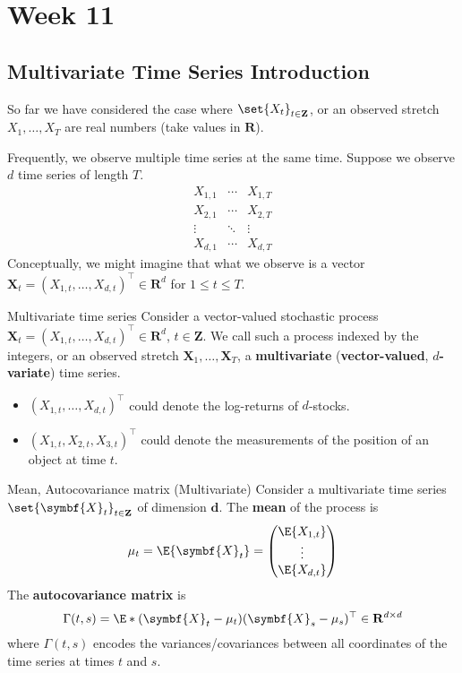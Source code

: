\chapter{Week 11}
\section{Multivariate Time Series Introduction}
So far we have considered the case where
$ \set{X_t}_{t\in\mathbf{Z}} $,
or an observed stretch $ X_1,\ldots,X_T $
are real numbers (take values in $ \mathbf{R} $).

Frequently, we observe multiple time series at the same time.
Suppose we observe $ d $ time series of length $ T $.
\[ \begin{matrix}
        X_{1,1} & \cdots & X_{1,T} \\
        X_{2,1} & \cdots & X_{2,T} \\
        \vdots  & \ddots & \vdots  \\
        X_{d,1} & \cdots & X_{d,T}
    \end{matrix} \]
Conceptually, we might imagine that what we observe
is a vector $ \symbf{X}_t=(X_{1,t},\ldots,X_{d,t})^\top\in\mathbf{R}^d $
for $ 1\le t\le T $.
\begin{Definition}{Multivariate time series}{}
    Consider a vector-valued stochastic process
    $ \symbf{X}_t=(X_{1,t},\ldots,X_{d,t})^\top\in\mathbf{R}^d $,
    $ t\in\mathbf{Z} $. We call such a process indexed
    by the integers, or an observed stretch
    $ \symbf{X}_1,\ldots,\symbf{X}_{T} $,
    a \textbf{multivariate} (\textbf{vector-valued}, \textbf{$d$-variate}) time series.
\end{Definition}
\begin{Example}{}{}
    \begin{itemize}
        \item $ (X_{1,t},\ldots,X_{d,t})^\top $ could denote the log-returns of $ d $-stocks.
        \item $ (X_{1,t},X_{2,t},X_{3,t})^\top $ could denote the measurements of the position
              of an object at time $ t $.
    \end{itemize}
\end{Example}
\begin{Definition}{Mean, Autocovariance matrix (Multivariate)}{}
    Consider a multivariate time series $ \set{\symbf{X}_t}_{t\in\mathbf{Z}} $
    of dimension $ \symbf{d} $. The \textbf{mean} of the process is
    \[ \mu_t=\E{\symbf{X}_t}=\begin{pmatrix}
            \E{X_{1,t}} \\
            \vdots      \\
            \E{X_{d,t}}
        \end{pmatrix} \]
    The \textbf{autocovariance matrix} is
    \[ \Gamma(t,s)=\E*{(\symbf{X}_t-\mu_t)(\symbf{X}_s-\mu_s)^\top}\in\mathbf{R}^{d\times d} \]
    where $ \Gamma(t,s) $ encodes the variances/covariances between all coordinates
    of the time series at times $ t $ and $ s $.
\end{Definition}
